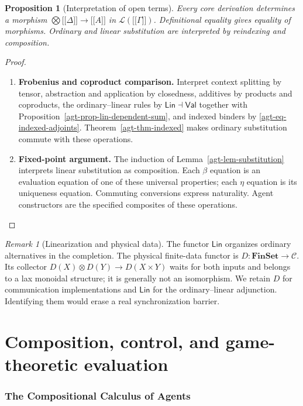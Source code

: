 \documentclass[11pt,a4paper]{article}
\numberwithin{equation}{section}
\newtheorem{proposition}[theorem]{Proposition}
\theoremstyle{definition}
\theoremstyle{remark}
\newtheorem{remark}[theorem]{Remark}
\theoremstyle{plain}
\providecommand{\Lin}{\mathsf{Lin}}
\providecommand{\Val}{\mathsf{Val}}
\providecommand{\cC}{\mathcal{C}}
\providecommand{\cL}{\mathcal{L}}
\providecommand{\llbracket}{\mathopen{[\![}}
\providecommand{\rrbracket}{\mathclose{]\!]}}
\providecommand{\sem}[1]{\llbracket #1\rrbracket}
\begin{document}
\begin{proposition}[Interpretation of open terms]
\label{agt-prop-core-sound}
Every core derivation determines a morphism
$\bigotimes\sem\Delta\to\sem A$ in $\cL(\sem\Gamma)$.
Definitional equality gives equality of morphisms. Ordinary and linear
substitution are interpreted by reindexing and composition.
\end{proposition}
\begin{proof}
\leavevmode
\begin{enumerate}[label=\textup{(\arabic*)},leftmargin=*,itemsep=4pt,topsep=3pt]
  \item \textbf{Frobenius and coproduct comparison.} Interpret context splitting by tensor, abstraction and application by
closedness, additives by products and coproducts, the ordinary--linear
rules by $\Lin\dashv\Val$ together with
Proposition~\ref{agt-prop-lin-dependent-sum}, and indexed binders by
\eqref{agt-eq-indexed-adjoints}. Theorem~\ref{agt-thm-indexed} makes ordinary
substitution commute with these operations.
  \item \textbf{Fixed-point argument.} The induction of
Lemma~\ref{agt-lem-substitution} interprets linear substitution as
composition. Each $\beta$ equation is an evaluation equation of one of
these universal properties; each $\eta$ equation is its uniqueness
equation. Commuting conversions express naturality. Agent constructors
are the specified composites of these operations.
\end{enumerate}
\end{proof}

\begin{remark}[Linearization and physical data]
The functor $\Lin$ organizes ordinary alternatives in the completion.
The physical finite-data functor is $D:\mathbf{FinSet}\to\cC$.
Its collector $D(X)\otimes D(Y)\to D(X\times Y)$ waits for both inputs
and belongs to a lax monoidal structure; it is generally not an isomorphism.
We retain $D$ for communication implementations and $\Lin$ for the
ordinary--linear adjunction. Identifying them would erase a real
synchronization barrier.
\end{remark}

\part{Composition, control, and game-theoretic evaluation}

\section{The Compositional Calculus of Agents}\label{sec:paper-3}
\end{document}

